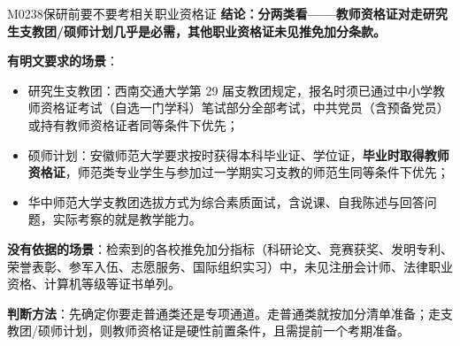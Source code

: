 \begin{qa}{M0238}{保研前要不要考相关职业资格证}
\textbf{结论：分两类看——教师资格证对走研究生支教团/硕师计划几乎是必需，其他职业资格证未见推免加分条款。}

\textbf{有明文要求的场景}：
\begin{itemize}
  \item 研究生支教团：西南交通大学第 29 届支教团规定，报名时须已通过中小学教师资格证考试（自选一门学科）笔试部分全部考试，中共党员（含预备党员）或持有教师资格证者同等条件下优先；
  \item 硕师计划：安徽师范大学要求按时获得本科毕业证、学位证，\textbf{毕业时取得教师资格证}，师范类专业学生与参加过一学期实习支教的师范生同等条件下优先；
  \item 华中师范大学支教团选拔方式为综合素质面试，含说课、自我陈述与回答问题，实际考察的就是教学能力。
\end{itemize}

\textbf{没有依据的场景}：检索到的各校推免加分指标（科研论文、竞赛获奖、发明专利、荣誉表彰、参军入伍、志愿服务、国际组织实习）中，未见注册会计师、法律职业资格、计算机等级等证书单列。

\textbf{判断方法}：先确定你要走普通类还是专项通道。走普通类就按加分清单准备；走支教团/硕师计划，则教师资格证是硬性前置条件，且需提前一个考期准备。
\end{qa}

